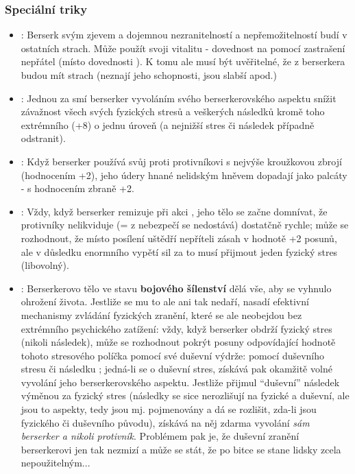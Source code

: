 \documentclass[../main.tex]{subfiles}
\begin{document}
\subsubsection*{Speciální triky}
\begin{itemize}
\item {}: Berserk svým zjevem a dojemnou nezranitelností a nepřemožitelností budí v ostatních strach. Může použít svoji vitalitu - dovednost  na  pomocí zastrašení nepřátel (místo dovednosti ). K tomu ale musí být uvěřitelné, že z berserkera budou mít strach (neznají jeho schopnosti, jsou slabší apod.)
\item {}: Jednou za  smí berserker vyvoláním svého berserkerovského aspektu snížit závažnost všech svých fyzických stresů a veškerých následků kromě toho extrémního (+8) o jednu úroveň (a nejnižší stres či následek případně odstranit).
\item {}: Když berserker používá svůj  proti protivníkovi s nejvýše kroužkovou zbrojí (hodnocením +2), jeho údery hnané nelidským hněvem dopadají jako palcáty - s hodnocením zbraně +2. 
\item {}: Vždy, když berserker remizuje při akci , jeho tělo se začne domnívat, že protivníky nelikviduje (= z nebezpečí se nedostává) dostatčně rychle; může se rozhodnout, že místo posílení uštědří nepříteli zásah v hodnotě +2 posunů, ale v důsledku enormního vypětí sil za to musí přijmout jeden fyzický stres (libovolný).
\item {}: Berserkerovo tělo ve stavu \textbf{bojového šílenství}
 dělá vše, aby se vyhnulo ohrožení života. Jestliže se mu to ale ani tak nedaří, nasadí efektivní mechanismy zvládání fyzických zranění, které se ale neobejdou bez extrémního psychického zatížení: vždy, když berserker obdrží fyzický stres (nikoli následek), může se rozhodnout pokrýt posuny odpovídající hodnotě tohoto stresového políčka pomocí své duševní výdrže: pomocí duševního stresu či následku ; jedná-li se o duševní stres, získává pak okamžitě volné vyvolání jeho berserkerovského aspektu. Jestliže přijmul ``duševní'' následek výměnou za fyzický stres (následky se sice nerozlišují na fyzické a duševní, ale jsou to aspekty, tedy jsou mj. pojmenovány a dá se rozlišit, zda-li jsou fyzického či duševního původu), získává na něj zdarma vyvolání \textit{sám berserker a nikoli protivník}. Problémem pak je, že duševní zranění berserkerovi jen tak nezmizí a může se stát, že po bitce se stane lidsky zcela nepoužitelným... 



\end{itemize}
\end{document}
